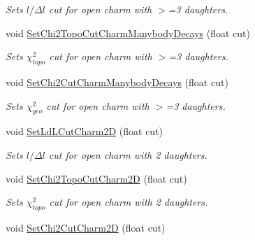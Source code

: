 \begin{DoxyCompactItemize}
\begin{DoxyCompactList}\small\item\em Sets $l/\Delta l$ cut for open charm with $>$=3 daughters. \end{DoxyCompactList}\item 
void \hyperlink{classKFParticleFinder_aaa65a45d9919b7e96796905fc4f0241d}{Set\+Chi2\+Topo\+Cut\+Charm\+Manybody\+Decays} (float cut)\hypertarget{classKFParticleFinder_aaa65a45d9919b7e96796905fc4f0241d}{}\label{classKFParticleFinder_aaa65a45d9919b7e96796905fc4f0241d}

\begin{DoxyCompactList}\small\item\em Sets $\chi^2_{topo}$ cut for open charm with $>$=3 daughters. \end{DoxyCompactList}\item 
void \hyperlink{classKFParticleFinder_a788a96a3d03c7398d82cd35552a742c9}{Set\+Chi2\+Cut\+Charm\+Manybody\+Decays} (float cut)\hypertarget{classKFParticleFinder_a788a96a3d03c7398d82cd35552a742c9}{}\label{classKFParticleFinder_a788a96a3d03c7398d82cd35552a742c9}

\begin{DoxyCompactList}\small\item\em Sets $\chi^2_{geo}$ cut for open charm with $>$=3 daughters. \end{DoxyCompactList}\item 
void \hyperlink{classKFParticleFinder_a3e5b8b5bb090df8a8be456801d86aec9}{Set\+Ld\+L\+Cut\+Charm2D} (float cut)\hypertarget{classKFParticleFinder_a3e5b8b5bb090df8a8be456801d86aec9}{}\label{classKFParticleFinder_a3e5b8b5bb090df8a8be456801d86aec9}

\begin{DoxyCompactList}\small\item\em Sets $l/\Delta l$ cut for open charm with 2 daughters. \end{DoxyCompactList}\item 
void \hyperlink{classKFParticleFinder_ac5e988b4db8036532c087405422ffabd}{Set\+Chi2\+Topo\+Cut\+Charm2D} (float cut)\hypertarget{classKFParticleFinder_ac5e988b4db8036532c087405422ffabd}{}\label{classKFParticleFinder_ac5e988b4db8036532c087405422ffabd}

\begin{DoxyCompactList}\small\item\em Sets $\chi^2_{topo}$ cut for open charm with 2 daughters. \end{DoxyCompactList}\item 
void \hyperlink{classKFParticleFinder_abb1e95ce14a97ab7693128fe20bbd541}{Set\+Chi2\+Cut\+Charm2D} (float cut)\hypertarget{classKFParticleFinder_abb1e95ce14a97ab7693128fe20bbd541}{}\label{classKFParticleFinder_abb1e95ce14a97ab7693128fe20bbd541}


\end{DoxyCompactItemize}
